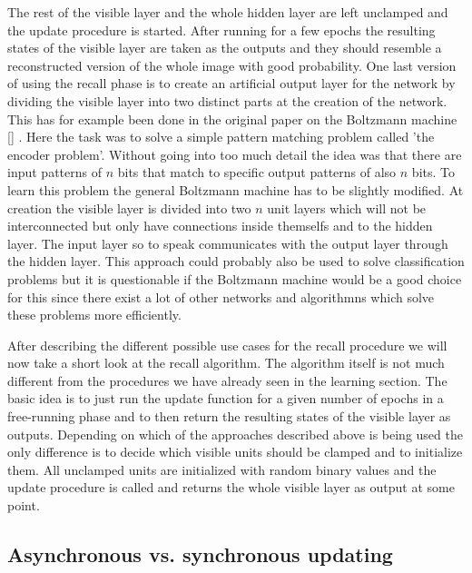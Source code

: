 \documentclass[12pt,twoside]{article}
\theoremstyle{plain}
\theoremstyle{definition}
\theoremstyle{remark}
\begin{document}
The rest of the visible layer and the whole hidden layer are left unclamped and the update procedure is started.
After running for a few epochs the resulting states of the visible layer are taken as the outputs and they should
resemble a reconstructed version of the whole image with good probability.\newline
One last version of using the recall phase is to create an artificial output layer for the network by dividing the visible layer
into two distinct parts at the creation of the network. This has for example been done in the original paper on the Boltzmann
machine \ref{} . Here the task was to solve a simple pattern matching problem called 'the encoder problem'.
Without going into too much detail the idea was that there are input patterns of $n$ bits that match to specific output
patterns of also $n$ bits. To learn this problem the general Boltzmann machine has to be slightly modified.
At creation the visible layer is divided into two $n$ unit layers which will not be interconnected but only have 
connections inside themselfs and to the hidden layer. The input layer so to speak communicates with the output layer
through the hidden layer. This approach could probably also be used to solve classification problems but it
is questionable if the Boltzmann machine would be a good choice for this since there exist a lot of other 
networks and algorithmns which solve these problems more efficiently.\newline

After describing the different possible use cases for the recall procedure we will now take a short look at 
the recall algorithm. The algorithm itself is not much different from the 
procedures we have already seen in the learning section. The basic idea is to just run the update function
for a given number of epochs in a free-running phase and to then return the resulting states of the
visible layer as outputs. Depending on which of the approaches described above is being used the only
difference is to decide which visible units should be clamped and to initialize them. 
All unclamped units are initialized with random binary values and the update procedure is called 
and returns the whole visible layer as output at some point.


\subsection{Asynchronous vs. synchronous updating}
\label{subsec:updating-procedures}
\end{document}
